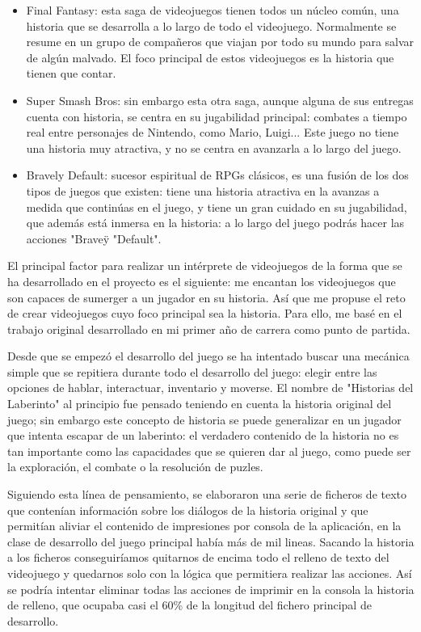 \begin{itemize}
	\item Final Fantasy: esta saga de videojuegos tienen todos un núcleo común, una historia que se desarrolla a lo largo de todo el videojuego. Normalmente se resume en un grupo de compañeros que viajan por todo su mundo para salvar de algún malvado. El foco principal de estos videojuegos es la historia que tienen que contar.
	\item Super Smash Bros: sin embargo esta otra saga, aunque alguna de sus entregas cuenta con historia, se centra en su jugabilidad principal: combates a tiempo real entre personajes de Nintendo, como Mario, Luigi... Este juego no tiene una historia muy atractiva, y no se centra en avanzarla a lo largo del juego.
	\item Bravely Default: sucesor espiritual de RPGs clásicos, es una fusión de los dos tipos de juegos que existen: tiene una historia atractiva en la avanzas a medida que continúas en el juego, y tiene un gran cuidado en su jugabilidad, que además está inmersa en la historia: a lo largo del juego podrás hacer las acciones "Brave\" y "Default".
\end{itemize} 

El principal factor para realizar un intérprete de videojuegos de la forma que se ha desarrollado en el proyecto es el siguiente: me encantan los videojuegos que son capaces de sumerger a un jugador en su historia. Así que me propuse el reto de crear videojuegos cuyo foco principal sea la historia. Para ello, me basé en el trabajo original desarrollado en mi primer año de carrera como punto de partida.

Desde que se empezó el desarrollo del juego se ha intentado buscar una mecánica simple que se repitiera durante todo el desarrollo del juego: elegir entre las opciones de hablar, interactuar, inventario y moverse. 
El nombre de "Historias del Laberinto" al principio fue pensado teniendo en cuenta la historia original del juego; sin embargo este concepto de historia se puede generalizar en un jugador que intenta escapar de un laberinto: el verdadero contenido de la historia no es tan importante como las capacidades que se quieren dar al juego, como puede ser la exploración, el combate o la resolución de puzles.

Siguiendo esta línea de pensamiento, se elaboraron una serie de ficheros de texto que contenían información sobre los diálogos de la historia original y que permitían aliviar el contenido de impresiones por consola de la aplicación, en la clase de desarrollo del juego principal había más de mil lineas.
Sacando la historia a los ficheros conseguiríamos quitarnos de encima todo el relleno de texto del videojuego y quedarnos solo con la lógica que permitiera realizar las acciones. Así se podría intentar eliminar todas las acciones de imprimir en la consola la historia de relleno, que ocupaba casi el 60\% de la longitud del fichero principal de desarrollo.

